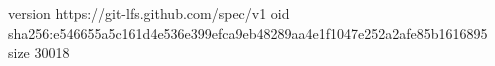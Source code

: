 version https://git-lfs.github.com/spec/v1
oid sha256:e546655a5c161d4e536e399efca9eb48289aa4e1f1047e252a2afe85b1616895
size 30018

